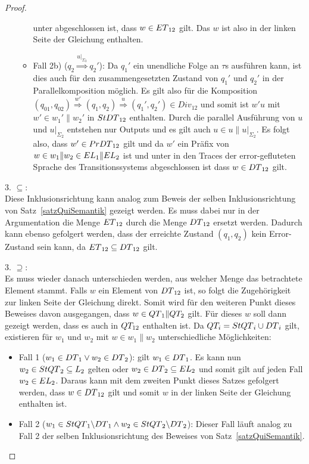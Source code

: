 \begin{proof}
\begin{itemize}
\begin{itemize}
          \ET{} unter \cont{} abgeschlossen ist, dass $w\in ET{}_{12}$ gilt.
          Das $w$ ist also in der linken Seite der Gleichung enthalten.
        \item Fall 2b) \big($q_2 \overset{u|_{\Sigma _2}}{\Rightarrow}
          q_2'$\big): Da
          $q_1'$ ein unendliche Folge an $\tau$s ausführen kann, ist dies auch
          für den zusammengesetzten Zustand von $q_1'$ und $q_2'$ in der
          Parallelkomposition möglich. Es gilt also für die Komposition
          $(q_{01},q_{02}) \overset{w'}{\Rightarrow} (q_1,q_2)
          \overset{u}{\Rightarrow} (q_1',q_2')\in Div_{12}$ und somit ist $w'u$
          mit $w'\in w_1'\|w_2'$ in $StDT{}_{12}$ enthalten. Durch die
          parallel Ausführung von $u$ und $u|_{\Sigma _2}$ entstehen nur
          Outputs und es gilt auch $u\in u\|u|_{\Sigma _2}$. Es folgt also,
          dass $w'\in PrDT{}_{12}$ gilt und da $w'$ ein Präfix von $w\in
          w_1\|w_2 \in EL{}_1\|EL{}_2$ ist und \DT{} unter \cont{} in den
          Traces der error-gefluteten Sprache \EL{} des Transitionssystems
          abgeschlossen ist dass $w\in DT{}_{12}$ gilt.
      \end{itemize}
  \end{itemize}

  3. \glqq{}$\subseteq$\grqq{}:\\
  Diese Inklusionsrichtung kann analog zum Beweis der selben Inklusionsrichtung
  von Satz~\ref{satzQuiSemantik} gezeigt werden. Es muss dabei nur in der
  Argumentation die Menge $ET{}_{12}$ durch die Menge $DT{}_{12}$ ersetzt
  werden. Dadurch kann ebenso gefolgert werden, dass der erreichte Zustand
  $(q_1,q_2)$ kein Error-Zustand sein kann, da $ET{}_{12}\subseteq DT{}_{12}$
  gilt.

  3. \glqq{}$\supseteq$\grqq{}:\\
  Es muss wieder danach unterschieden werden, aus welcher Menge das betrachtete
  Element stammt. Falls $w$ ein Element von $DT{}_{12}$ ist, so folgt die
  Zugehörigkeit zur linken Seite der Gleichung direkt. Somit wird für den
  weiteren Punkt dieses Beweises davon ausgegangen, dass $w\in QT{}_1\|QT_2$
  gilt. Für dieses $w$ soll dann gezeigt werden, dass es auch in $QT_{12}$
  enthalten ist. Da $QT_i=StQT{}_i\cup DT{}_i$ gilt, existieren für $w_1$
  und $w_2$ mit $w\in w_1\|w_2$ unterschiedliche Möglichkeiten:
  \begin{itemize}
    \item Fall 1 ($w_1\in DT{}_1 \vee w_2\in DT{}_2$): \OBdA{} gilt $w_1\in
      DT{}_1$. Es kann nun $w_2\in StQT{}_2 \subseteq L_2$ gelten oder
      $w_2\in DT{}_2\subseteq EL{}_2$ und somit gilt auf jeden Fall $w_2\in
      EL{}_2$. Daraus kann mit dem zweiten Punkt dieses Satzes gefolgert
      werden, dass $w\in DT{}_{12}$ gilt und somit $w$ in der linken Seite der
      Gleichung enthalten ist.
    \item Fall 2 ($w_1\in StQT{}_1\backslash DT{}_1 \wedge w_2\in StQT{}_2
      \backslash DT{}_2$): Dieser Fall läuft analog zu Fall 2 der selben
      Inklusionsrichtung des Beweises von Satz~\ref{satzQuiSemantik}.
  \end{itemize}
\end{proof}


